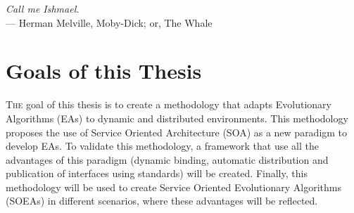 \label{chap:introduction}
\begin{flushright}{\slshape
    Call me Ishmael.} \\ \medskip
    --- {Herman Melville, Moby-Dick; or, The Whale}
\end{flushright}
\minitoc\mtcskip
\vfill



\section{Goals of this Thesis} %


\lettrine{T}{he} goal of this thesis is to create a methodology that adapts Evolutionary Algorithms (EAs) to dynamic and distributed environments. This methodology proposes the use of Service Oriented Architecture (SOA) as a new paradigm to develop EAs. To validate this methodology, a framework that use all the advantages of this paradigm (dynamic binding, automatic distribution and publication of interfaces using standards) will be created. Finally, this methodology will be used to create Service Oriented Evolutionary Algorithms (SOEAs) in different scenarios, where these advantages will be reflected.

